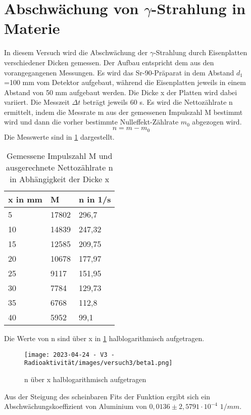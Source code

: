 \documentclass[../protokoll.tex]{subfiles}
\begin{document}
\section{Abschwächung von \texorpdfstring{$\gamma$}{Gamma}-Strahlung in Materie}\label{sec:Abschwächung Gamma-Strahlung}
In diesem Versuch wird die Abschwächung der $\gamma$-Strahlung durch Eisenplatten verschiedener Dicken gemessen. Der Aufbau entspricht dem aus den vorangegangenen Messungen. Es wird das Sr-90-Präparat in dem Abstand $d_1$=100 mm vom Detektor aufgebaut, während die Eisenplatten jeweils in einem Abstand von 50 mm aufgebaut werden. Die Dicke x der Platten wird dabei variiert. Die Messzeit $\Delta t$ beträgt jeweils 60 s. Es wird die Nettozählrate n ermittelt, indem die Messrate m aus der gemessenen Impulszahl M bestimmt wird und dann die vorher bestimmte Nulleffekt-Zählrate $m_0$ abgezogen wird.
\begin{equation}
        n=m-m_0
\end{equation}
Die Messwerte sind in \ref{tab3} dargestellt.
\begin{table}[h]
\centering
\begin{tabular}{|l|l|l|}
\hline
x in mm & M     & n in 1/s \\ \hline
5       & 17802 & 296,7    \\ \hline
10      & 14839 & 247,32   \\ \hline
15      & 12585 & 209,75   \\ \hline
20      & 10678 & 177,97   \\ \hline
25      & 9117  & 151,95   \\ \hline
30      & 7784  & 129,73   \\ \hline
35      & 6768  & 112,8    \\ \hline
40      & 5952  & 99,1     \\ \hline
\end{tabular}
\caption{Gemessene Impulszahl M und ausgerechnete Nettozählrate n in Abhängigkeit der Dicke x}
\label{tab3}
\end{table}
Die Werte von n sind über x in \ref{beta1} halblogarithmisch aufgetragen.
\begin{figure}
    \centering
    \texttt{[image: 2023-04-24 - V3 - Radioaktivität/images/versuch3/beta1.png]}
    \caption{n über x halblogarithmisch aufgetragen}
    \label{beta1}
\end{figure}
Aus der Steigung des scheinbaren Fits der Funktion ergibt sich ein Abschwächungskoeffizient von Aluminium von $0,0136 \pm 2,5791 \cdot 10^{-4}$ $1/mm$.
\end{document}
